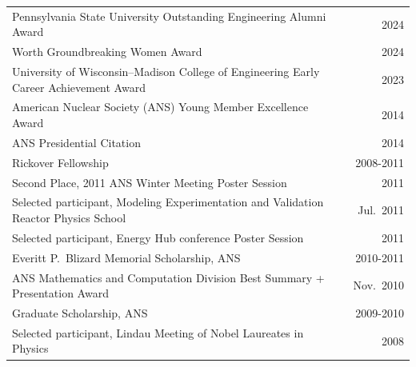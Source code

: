 \begin{tabular}{ @{} l @{\hspace{0.5ex}} r }
Pennsylvania State University Outstanding Engineering Alumni Award & 2024\\
Worth Groundbreaking Women Award & 2024\\
University of Wisconsin--Madison College of Engineering Early Career Achievement Award & 2023\\
American Nuclear Society (ANS) Young Member Excellence Award & 2014 \\
ANS Presidential Citation & 2014 \\
Rickover Fellowship 	& 2008-2011 \\
Second Place, 2011 ANS Winter Meeting Poster Session	&2011\\
Selected participant, Modeling Experimentation and Validation Reactor Physics School	& Jul.\ 2011\\
Selected participant, Energy Hub conference Poster Session	&2011\\
Everitt P.\ Blizard Memorial Scholarship, ANS	&2010-2011\\
ANS Mathematics and Computation Division Best Summary + Presentation Award  &Nov.\ 2010\\
Graduate Scholarship, ANS 	&2009-2010\\
Selected participant, Lindau Meeting of Nobel Laureates in Physics &	2008\\
\end{tabular}
